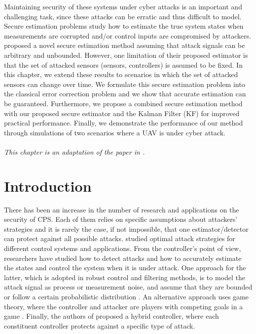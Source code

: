 \documentclass[../../thesis.tex]{subfiles}
\begin{document}
Maintaining security of these systems under cyber attacks is an important and challenging task, since these attacks can be erratic and thus difficult to model. Secure estimation problems study how to estimate the true system states when  measurements are corrupted and/or control inputs are compromised by attackers. \cite{Fawzi:2014} proposed a novel secure estimation method assuming that attack signals can be arbitrary and unbounded. However, one limitation of their proposed estimator is that the set of attacked sensors (sensors, controllers) is assumed to be fixed. 
In this chapter, we extend these results to scenarios in which the set of attacked sensors can change over time. We formulate this secure estimation problem into the classical error correction problem \cite{tao11} and we show that accurate estimation can be guaranteed. Furthermore, we propose a combined secure estimation method with our proposed secure estimator and the Kalman Filter (KF) for improved practical performance. Finally,  we demonstrate the performance of our method through simulations of two scenarios where a UAV is under cyber attack.
\\
\\
\noindent
\textit{This chapter is an adaptation of the paper in \cite{Hu:2016uav}.}

\section{Introduction}

There has been an increase in the number of research and applications on the security of CPS. Each of them relies on specific assumptions about attackers' strategies and it is rarely the case, if not impossible, that one estimator/detector can protect against all possible attacks. 
\cite{Tong}\cite{KwonACC}\cite{liu2011false}\cite{teixeira2010cyber} studied optimal attack strategies for different control systems and applications. From the controller's point of view, researchers have studied how to detect attacks \cite{Blanke}\cite{Willsky} and how to accurately estimate the states and control the system when it is under attack. One approach for the latter, which is adopted in robust control and filtering methods, is to model the attack signal as process or measurement noise, and assume that they are bounded \cite{Zhou_Doyle} or follow a certain probabilistic distribution \cite{Bullo}\cite{Liu}.
An alternative approach uses game theory, where the controller and attacker are players with competing goals in a game \cite{Wu}\cite{Basar}\cite{Basar2}\cite{Walrand}\cite{Pappas}. Finally, the authors of \cite{KwonCDC} proposed a hybrid controller, where each constituent controller protects against a specific type of attack.
\end{document}
